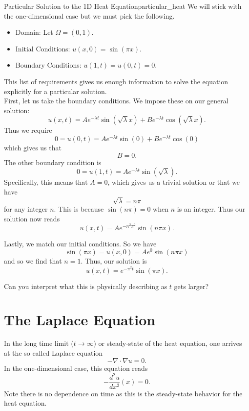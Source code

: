         \begin{ex}{Particular Solution to the 1D Heat Equation}{particular_heat}
        We will stick with the one-dimensional case but we must pick the following.  
        \begin{itemize}
            \item Domain: Let $\Omega = (0,1)$.
            \item Initial Conditions: $u(x,0)=\sin(\pi x)$.
            \item Boundary Conditions: $u(1,t)=u(0,t)=0$.  
        \end{itemize}
        This list of requirements gives us enough information to solve the equation explicitly for a particular solution.\\
        
        First, let us take the boundary conditions. We impose these on our general solution:
        \[
        u(x,t)=Ae^{-\lambda t}\sin(\sqrt{\lambda}x)+Be^{-\lambda t}\cos(\sqrt{\lambda}x).
        \]
        Thus we require
        \[
        0=u(0,t)=Ae^{-\lambda t}\sin(0)+Be^{-\lambda t}\cos(0)
        \]
        which gives us that
        \[
        B=0.
        \]
        The other boundary condition is
        \[
        0=u(1,t)=Ae^{-\lambda t}\sin(\sqrt{\lambda}).
        \]
        Specifically, this means that $A=0$, which gives us a trivial solution or that we have
        \[
        \sqrt{\lambda}=n\pi
        \]
        for any integer $n$.  This is because $\sin(n\pi)=0$ when $n$ is an integer. Thus our solution now reads
        \[
        u(x,t)=Ae^{-n^2\pi^2}\sin(n\pi x).
        \]
        
        Lastly, we match our initial conditions.  So we have
        \[
        \sin(\pi x)=u(x,0)=A e^0 \sin(n\pi x)
        \]
        and so we find that $n=1$.  Thus, our solution is
        \[
        \boxed{u(x,t)=e^{-\pi^2 t} \sin(\pi x).}
        \]
        \end{ex}
        
        \begin{exercise}
        Can you interpret what this is physically describing as $t$ gets larger?
        \end{exercise}
        
    
        \section{The Laplace Equation}
        In the long time limit ($t\to \infty$) or steady-state of the heat equation, one arrives at the so called Laplace equation
        \[
        -\nabla \cdot \nabla u = 0.
        \]
        In the one-dimensional case, this equation reads
        \[
        -\frac{d^2 u}{dx^2}(x) = 0.
        \]
        Note there is no dependence on time as this is the steady-state behavior for the heat equation.
        
